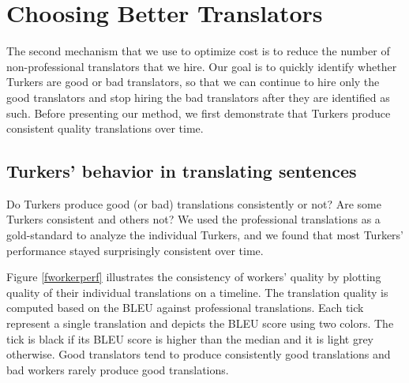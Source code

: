 \onehalfspaced

\section{Choosing Better Translators}

The second mechanism that we use to optimize cost is to reduce the number of non-professional translators that we hire.  Our goal is to quickly identify whether Turkers are good or bad translators, so that we can continue to hire only the good translators and stop hiring the bad translators after they are identified as such. 
%
Before presenting our method, we first demonstrate that Turkers produce consistent quality translations over time.


\subsection{Turkers' behavior in translating sentences}

Do Turkers produce good (or bad) translations consistently or not? Are some Turkers  consistent and others not? We used the professional translations as a gold-standard to analyze the individual Turkers, and we found that most Turkers' performance stayed surprisingly consistent over time. 

Figure \ref{fworkerperf} illustrates the consistency of workers' quality by plotting quality of their individual translations on a timeline. The translation quality is computed based on the BLEU against professional translations. Each tick represent a single translation and depicts the BLEU score using two colors. The tick is black if its BLEU score is higher than the median and it is light grey otherwise. Good translators tend to produce consistently good translations and bad workers rarely produce good translations.





